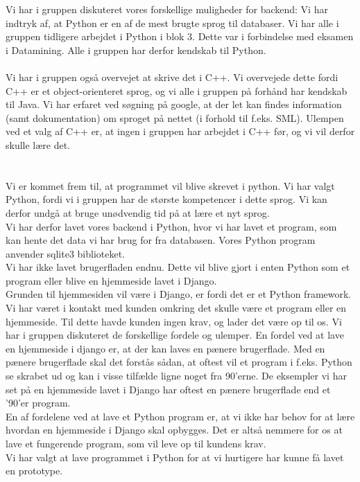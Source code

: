 \documentclass[a4paper]{article}
\begin{document}
Vi har i gruppen diskuteret vores forskellige muligheder for backend:
Vi har indtryk af, at Python er en af de mest brugte sprog til databaser. Vi har alle i gruppen tidligere arbejdet i Python i blok 3. Dette var i forbindelse med eksamen i Datamining. Alle i gruppen har derfor kendskab til Python.\\ \\
Vi har i gruppen også overvejet at skrive det i C++. Vi overvejede dette fordi C++ er et object-orienteret sprog, og vi alle i gruppen på forhånd har kendskab til Java. Vi har erfaret ved søgning på google, at der let kan findes information (samt dokumentation) om sproget på nettet (i forhold til f.eks. SML). Ulempen ved et valg af C++ er, at ingen i gruppen har arbejdet i C++ før, og vi vil derfor skulle lære det. \\ \\ \\
Vi er kommet frem til, at programmet vil blive skrevet i python. Vi har valgt Python, fordi vi i gruppen har de største kompetencer i dette sprog. Vi kan derfor undgå at bruge unødvendig tid på at lære et nyt sprog. \\
Vi har derfor lavet vores backend i Python, hvor vi har lavet et program, som kan hente det data vi har brug for fra databasen. Vores Python program anvender sqlite3 biblioteket. \\
Vi har ikke lavet brugerfladen endnu. Dette vil blive gjort i enten Python som et program eller blive en hjemmeside lavet i Django.\\ Grunden til hjemmesiden vil være i Django, er fordi det er et Python framework. Vi har været i kontakt med kunden omkring det skulle være et program eller en hjemmeside. Til dette havde kunden ingen krav, og lader det være op til os. Vi har i gruppen diskuteret de forskellige fordele og ulemper. En fordel ved at lave en hjemmeside i django er, at der kan laves en pænere brugerflade. Med en pænere brugerflade skal det forstås sådan, at oftest vil et program i f.eks. Python se skrabet ud og kan i visse tilfælde ligne noget fra 90'erne. De eksempler vi har set på en hjemmeside lavet i Django har oftest en pænere brugerflade end et '90'er program. \\
En af fordelene ved at lave et Python program er, at vi ikke har behov for at lære hvordan en hjemmeside i Django skal opbygges. Det er altså nemmere for os at lave et fungerende program, som vil leve op til kundens krav. \\
Vi har valgt at lave programmet i Python for at vi hurtigere har kunne få lavet en prototype. \\
\end{document}
